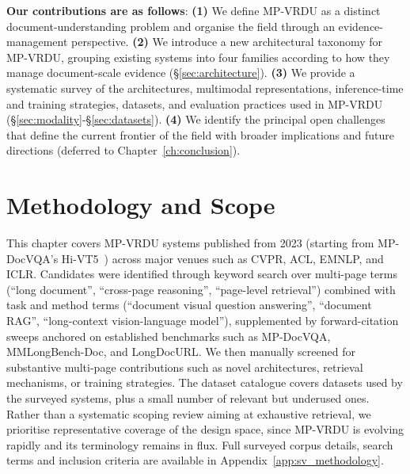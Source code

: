 \textbf{Our contributions are as follows}: \textbf{(1)} We define MP-VRDU as a distinct document-understanding problem and organise the field through an evidence-management perspective. \textbf{(2)} We introduce a new architectural taxonomy for MP-VRDU, grouping existing systems into four families according to how they manage document-scale evidence (\S\ref{sec:architecture}). \textbf{(3)} We provide a systematic survey of the architectures, multimodal representations, inference-time and training strategies, datasets, and evaluation practices used in MP-VRDU (\S\ref{sec:modality}-\S\ref{sec:datasets}). \textbf{(4)} We identify the principal open challenges that define the current frontier of the field with broader implications and future directions (deferred to Chapter~\ref{ch:conclusion}).



\section{Methodology and Scope}
\label{sec:methodology}
This chapter covers MP-VRDU systems published from 2023 (starting from MP-DocVQA's Hi-VT5~\cite{tito2023hierarchical}) across major venues such as CVPR, ACL, EMNLP, and ICLR. Candidates were identified through keyword search over multi-page terms (``long document'', ``cross-page reasoning'', ``page-level retrieval'') combined with task and method terms (``document visual question answering'', ``document RAG'', ``long-context vision-language model''), supplemented by forward-citation sweeps anchored on established benchmarks such as MP-DocVQA, MMLongBench-Doc, and LongDocURL. We then manually screened for substantive multi-page contributions such as novel architectures, retrieval mechanisms, or training strategies. The dataset catalogue covers datasets used by the surveyed systems, plus a small number of relevant but underused ones. Rather than a systematic scoping review aiming at exhaustive retrieval, we prioritise representative coverage of the design space, since MP-VRDU is evolving rapidly and its terminology remains in flux. Full surveyed corpus details, search terms and inclusion criteria are available in Appendix~\ref{app:sv_methodology}.

